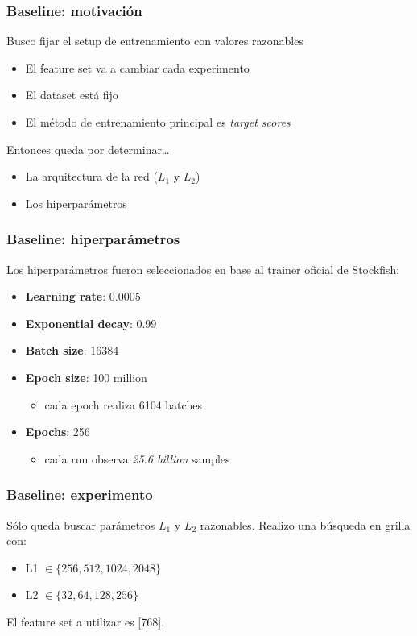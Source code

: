 
\begin{frame}
\frametitle{Baseline: motivación}
Busco fijar el setup de entrenamiento con valores razonables \pause
\begin{itemize}
\item El feature set va a cambiar cada experimento \pause
\item El dataset está fijo \pause
\item El método de entrenamiento principal es \textit{target scores} \pause
\end{itemize}
Entonces queda por determinar\dots
\begin{itemize}
\item La arquitectura de la red ($L_1$ y $L_2$) \pause
\item Los hiperparámetros
\end{itemize}
\end{frame}


\begin{frame}
\frametitle{Baseline: hiperparámetros}
Los hiperparámetros fueron seleccionados en base al trainer oficial de Stockfish: \pause
\begin{itemize}
\item \textbf{Learning rate}: 0.0005 \pause
\item \textbf{Exponential decay}: 0.99 \pause
\item \textbf{Batch size}: 16384 \pause
\item \textbf{Epoch size}: 100 million \pause
\begin{itemize}
    \item cada epoch realiza 6104 batches \pause
\end{itemize}
\item \textbf{Epochs}: 256
\begin{itemize}
    \item cada run observa \textit{25.6 billion} samples
\end{itemize}
\end{itemize}
\end{frame}


\begin{frame}
\frametitle{Baseline: experimento}
Sólo queda buscar parámetros $L_1$ y $L_2$ razonables. Realizo una búsqueda en grilla con:
\begin{itemize}
\item L1 $\in \{256, 512, 1024, 2048\}$
\item L2 $\in \{32, 64, 128, 256\}$
\end{itemize}
El feature set a utilizar es [768].
\end{frame}

